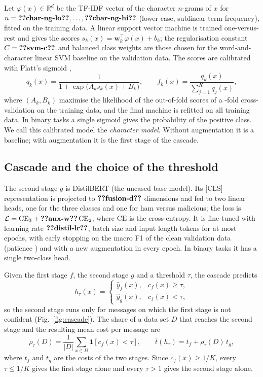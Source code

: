 Let $\varphi(x)\in\mathbb{R}^{d}$ be the TF-IDF vector of the character $n$-grams of $x$ for $n=\val{char-ng-lo},\dots,\val{char-ng-hi}$ (lower case, sublinear term frequency), fitted on the training data. A linear support vector machine \cite{cortes1995,joachims1998} is trained one-versus-rest and gives the scores $s_k(x)=\mathbf{w}_k^{\top}\varphi(x)+b_k$; the regularisation constant $C=\val{svm-c}$ and balanced class weights are those chosen for the word-and-character linear SVM baseline on the validation data. The scores are calibrated with Platt's sigmoid \cite{niculescu2005},
\begin{equation}\label{eq:platt}
q_k(x)=\frac{1}{1+\exp\bigl(A_k s_k(x)+B_k\bigr)},\qquad f_k(x)=\frac{q_k(x)}{\sum_{j=1}^{K}q_j(x)},
\end{equation}
where $(A_k,B_k)$ maximise the likelihood of the out-of-fold scores of a -fold cross-validation on the training data, and the final machine is refitted on all training data. In binary tasks a single sigmoid gives the probability of the positive class. We call this calibrated model the \emph{character model}. Without augmentation it is a baseline; with augmentation it is the first stage of the cascade.

\subsection{Cascade and the choice of the threshold}\label{sec:cascade}

The second stage $g$ is DistilBERT \cite{sanh2019} (the uncased base model). Its [CLS] representation is projected to $\val{fusion-d}$ dimensions and fed to two linear heads, one for the three classes and one for ham versus malicious; the loss is $\mathcal{L}=\mathrm{CE}_3+\val{aux-w}\,\mathrm{CE}_2$, where $\mathrm{CE}$ is the cross-entropy. It is fine-tuned with learning rate $\val{distil-lr}$, batch size  and input length  tokens for at most  epochs, with early stopping on the macro F1 of the clean validation data (patience ) and with a new augmentation in every epoch. In binary tasks it has a single two-class head.

Given the first stage $f$, the second stage $g$ and a threshold $\tau$, the cascade predicts
\begin{equation}\label{eq:cascade}
h_\tau(x)=\begin{cases}\hat{y}_f(x), & c_f(x)\ge\tau,\\ \hat{y}_g(x), & c_f(x)<\tau,\end{cases}
\end{equation}
so the second stage runs only for messages on which the first stage is not confident (Fig.~\ref{fig:cascade}). The share of a data set $D$ that reaches the second stage and the resulting mean cost per message are
\begin{equation}\label{eq:share}
\rho_\tau(D)=\frac{1}{|D|}\sum_{x\in D}\mathbf{1}[c_f(x)<\tau],\qquad \bar{t}(h_\tau)=t_f+\rho_\tau(D)\,t_g,
\end{equation}
where $t_f$ and $t_g$ are the costs of the two stages. Since $c_f(x)\ge 1/K$, every $\tau\le 1/K$ gives the first stage alone and every $\tau>1$ gives the second stage alone.

